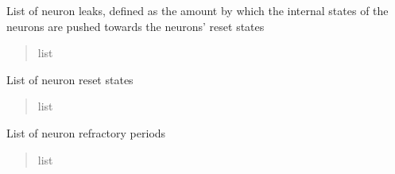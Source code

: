 \documentclass[letterpaper,10pt,english]{sphinxmanual}
\begin{document}
\begin{fulllineitems}
\begin{fulllineitems}
\label{\detokenize{index:superneuromat.SNN.neuron_leaks}}
\pysigstartsignatures
\pysigline
{}
\pysigstopsignatures
\sphinxAtStartPar
List of neuron leaks, defined as the amount by which the internal states of the neurons are pushed towards the neurons’ reset states
\begin{quote}\begin{description}
\sphinxAtStartPar
list

\end{description}\end{quote}

\end{fulllineitems}


\begin{fulllineitems}
\label{\detokenize{index:superneuromat.SNN.neuron_reset_states}}
\pysigstartsignatures
\pysigline
{}
\pysigstopsignatures
\sphinxAtStartPar
List of neuron reset states
\begin{quote}\begin{description}
\sphinxAtStartPar
list

\end{description}\end{quote}

\end{fulllineitems}


\begin{fulllineitems}
\label{\detokenize{index:superneuromat.SNN.neuron_refractory_periods}}
\pysigstartsignatures
\pysigline
{}
\pysigstopsignatures
\sphinxAtStartPar
List of neuron refractory periods
\begin{quote}\begin{description}
\sphinxAtStartPar
list

\end{description}\end{quote}


\end{fulllineitems}
\end{fulllineitems}
\end{document}
